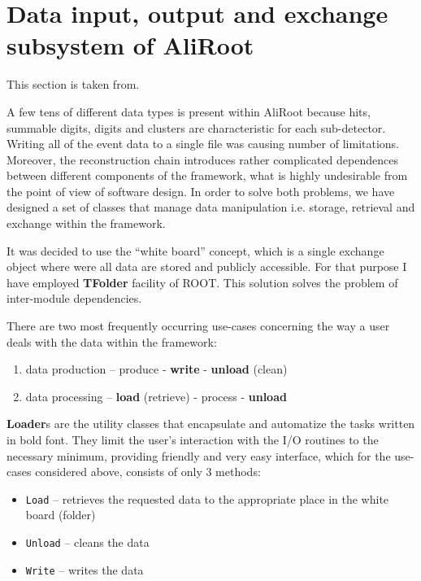 \documentclass[12pt,a4paper,twoside]{article}
\begin{document}
{%

\newpage
\section{Data input, output and exchange subsystem of AliRoot}

This section is taken from\cite{PiotrPhD}.

A few tens of different data types is present within AliRoot  because 
hits, summable digits, digits and clusters are characteristic for each
sub-detector. Writing all of the event data to a single file was
causing number of limitations.  
Moreover, the reconstruction chain introduces rather complicated dependences 
between different components of the framework, what is highly 
undesirable from the point of view  of software design.
In order to solve both problems, we have designed a set of classes that 
manage data manipulation i.e. storage, retrieval and exchange within 
the framework. 

It was decided to use the ``white board'' concept, which is a single
exchange object where were all data are stored and  publicly accessible.
For that purpose I have employed \textbf{TFolder} facility of ROOT.
This solution solves the problem of inter-module dependencies.

There are two most frequently occurring use-cases concerning the way a user deals with the data within the framework:
\begin{enumerate}
\item data production -- produce - \textbf{write} - \textbf{unload} (clean)
\item data processing -- \textbf{load} (retrieve) - process - \textbf{unload}
\end{enumerate}
% 
\textbf{Loader}s are the utility classes that encapsulate and 
automatize the tasks written in  bold font.
They limit the user's interaction with the I/O routines to the
necessary minimum, providing  friendly and very easy interface,
which for the use-cases considered above, consists of only 3 methods:
\begin{itemize}
\item \texttt{Load} --  retrieves the requested data to the appropriate place in the 
  white board (folder)
\item \texttt{Unload} -- cleans the data
\item \texttt{Write} -- writes the data
\end{itemize}

}
\end{document}
